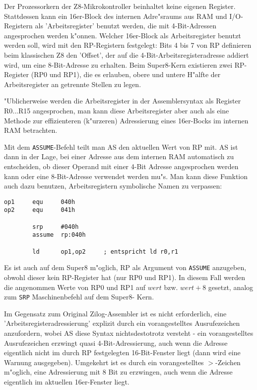 \documentclass[12pt,a4paper,twoside]{report}
\newcommand{\tty}[1]{{\tt #1}}
\begin{document}
Der Prozessorkern der Z8-Mikrokontroller beinhaltet keine eigenen
Register.  Stattdessen kann ein 16er-Block des internen Adre"sraums
aus RAM und I/O-Registern als 'Arbeitsregister' benutzt werden, die
mit 4-Bit-Adressen angesprochen werden k"onnen.  Welcher 16er-Block
als Arbeitsregister benutzt werden soll, wird mit den RP-Registern
festgelegt: Bits 4 bis 7 von RP definieren beim klassischen Z8 den
'Offset', der auf die 4-Bit-Arbeitsregisteradresse addiert wird,
um eine 8-Bit-Adresse zu erhalten.  Beim Super8-Kern existieren
zwei RP-Register (RP0 und RP1), die es erlauben, obere und untere
H"alfte der Arbeitsregister an getrennte Stellen zu legen.

"Ublicherweise werden die Arbeitsregister in der Assemblersyntax als
Register R0...R15 angesprochen, man kann diese Arbeitsregister aber
auch als eine Methode zur effizienteren (k"urzeren) Adressierung eines
16er-Bocks im internen RAM betrachten.

Mit dem \tty{ASSUME}-Befehl teilt man AS den aktuellen Wert von RP mit.  AS
ist dann in der Lage, bei einer Adresse aus dem internen RAM
automatisch zu entscheiden, ob dieser Operand mit einer 4-Bit Adresse
angesprochen werden kann oder eine 8-Bit-Adresse verwendet werden
mu"s.  Man kann diese Funktion auch dazu benutzen, Arbeitsregistern
symbolische Namen zu verpassen:
\begin{verbatim}
op1     equ     040h
op2     equ     041h

        srp     #040h
        assume  rp:040h

        ld      op1,op2		; entspricht ld r0,r1
\end{verbatim}
Es ist auch auf dem Super8 m"oglich, RP als Argument von \tty{ASSUME}
anzugeben, obwohl dieser kein RP-Register hat (nur RP0 und RP1).  In
diesem Fall werden die angenommen Werte von RP0 und RP1 auf $wert$ bzw.
$wert+8$ gesetzt, analog zum \tty{SRP} Maschinenbefehl auf dem Super8-
Kern.

Im Gegensatz zum Original Zilog-Assembler ist es nicht erforderlich,
eine 'Arbeitsregisteradressierung' explizit durch ein vorangestelltes
Ausrufezeichen anzufordern, wobei AS diese Syntax nichtsdestotrotz
versteht - ein vorangestelltes Ausrufezeichen erzwingt quasi
4-Bit-Adressierung, auch wenn die Adresse eigentlich nicht im durch
RP festgelegten 16-Bit-Fenster liegt (dann wird eine Warnung
ausgegeben).  Umgekehrt ist es durch ein vorangestelltes $>$-Zeichen
m"oglich, eine Adressierung mit 8 Bit zu erzwingen, auch wenn die
Adresse eigentlich im aktuellen 16er-Fenster liegt.
\end{document}
